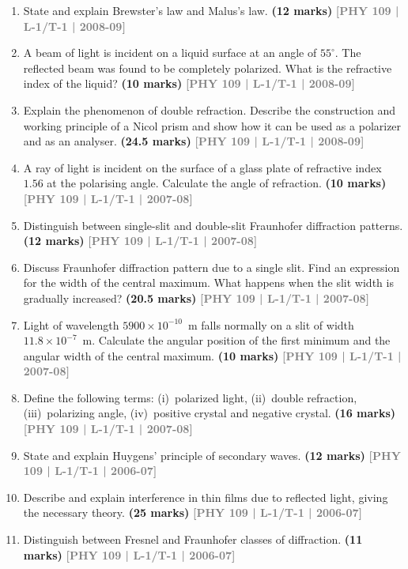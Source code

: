 \documentclass[12pt,a3paper]{article}
\newcommand{\yr}[1]{\hfill\textcolor{gray}{\small\textbf{[#1]}}}
\newcommand{\mk}[1]{\textcolor{orange!70!black}{\small\textbf{(#1 marks)}}}
\begin{document}
\begin{enumerate}
\item State and explain Brewster's law and Malus's law.
\mk{12} \yr{PHY 109 | L-1/T-1 | 2008-09}

\item A beam of light is incident on a liquid surface at an angle of $55^\circ$. The reflected beam was found to be completely polarized. What is the refractive index of the liquid?
\mk{10} \yr{PHY 109 | L-1/T-1 | 2008-09}

\item Explain the phenomenon of double refraction. Describe the construction and working principle of a Nicol prism and show how it can be used as a polarizer and as an analyser.
\mk{24.5} \yr{PHY 109 | L-1/T-1 | 2008-09}

\item A ray of light is incident on the surface of a glass plate of refractive index $1.56$ at the polarising angle. Calculate the angle of refraction.
\mk{10} \yr{PHY 109 | L-1/T-1 | 2007-08}

\item Distinguish between single-slit and double-slit Fraunhofer diffraction patterns.
\mk{12} \yr{PHY 109 | L-1/T-1 | 2007-08}

\item Discuss Fraunhofer diffraction pattern due to a single slit. Find an expression for the width of the central maximum. What happens when the slit width is gradually increased?
\mk{20.5} \yr{PHY 109 | L-1/T-1 | 2007-08}

\item Light of wavelength $5900\times10^{-10}$~m falls normally on a slit of width $11.8\times10^{-7}$~m. Calculate the angular position of the first minimum and the angular width of the central maximum.
\mk{10} \yr{PHY 109 | L-1/T-1 | 2007-08}

\item Define the following terms: (i)~polarized light, (ii)~double refraction, (iii)~polarizing angle, (iv)~positive crystal and negative crystal.
\mk{16} \yr{PHY 109 | L-1/T-1 | 2007-08}

\item State and explain Huygens' principle of secondary waves.
\mk{12} \yr{PHY 109 | L-1/T-1 | 2006-07}

\item Describe and explain interference in thin films due to reflected light, giving the necessary theory.
\mk{25} \yr{PHY 109 | L-1/T-1 | 2006-07}

\item Distinguish between Fresnel and Fraunhofer classes of diffraction.
\mk{11} \yr{PHY 109 | L-1/T-1 | 2006-07}


\end{enumerate}
\end{document}
